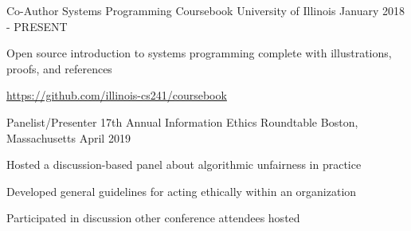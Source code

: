 

\begin{cventries}

  \cventry
    {Co-Author} %
    {Systems Programming Coursebook} %
    {University of Illinois} %
    {January 2018 - PRESENT} %
    {
      \begin{cvitems} %
        \item {Open source introduction to systems programming complete with illustrations, proofs, and references}
        \item {\href{https://github.com/illinois-cs241/coursebook}{https://github.com/illinois-cs241/coursebook}}
      \end{cvitems}
    }
    
    \cventry
    {Panelist/Presenter} %
    {17th Annual Information Ethics Roundtable} %
    {Boston, Massachusetts} %
    {April 2019} %
    {
    \begin{cvitems} %
        \item {Hosted a discussion-based panel about algorithmic unfairness in practice}
        \item {Developed general guidelines for acting ethically within an organization}
        \item {Participated in discussion other conference attendees hosted}
    \end{cvitems}
    }

\end{cventries}
